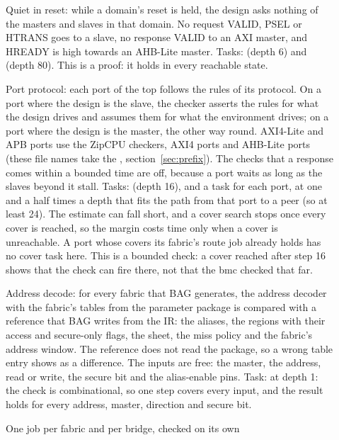 \begin{description}
\item[] Quiet in reset: while a domain's reset is held, the design
  asks nothing of the masters and slaves in that domain. No request VALID, PSEL or
  HTRANS goes to a slave, no response VALID to an AXI master, and HREADY is high towards
  an AHB-Lite master. Tasks:  (depth 6) and  (depth 80). This
  is a proof: it holds in every reachable state.
\item[] Port protocol: each port of the top follows the rules of
  its protocol. On a port where the design is the slave, the checker asserts the rules
  for what the design drives and assumes them for what the environment drives; on a
  port where the design is the master, the other way round. AXI4-Lite and APB ports use
  the ZipCPU checkers, AXI4 ports  and AHB-Lite ports
   (these file names take the ,
  section~\ref{sec:prefix}). The checks that a response comes within a bounded time are off,
  because a port waits as long as the slaves beyond it stall. Tasks:  (depth
  16), and a  task for each port, at one and a half times a depth that
  fits the path from that port to a peer (so at least 24). The estimate can fall short, and
  a cover search stops once every cover is reached, so the margin costs time only when a
  cover is unreachable. A port whose covers its fabric's route job already
  holds has no cover task here. This is a bounded check: a cover reached after step
  16 shows that the check can fire there, not that the bmc checked that far.
\item[] Address decode: for every fabric that BAG generates, the
  address decoder with the fabric's tables from the parameter package is compared with a
  reference that BAG writes from the IR: the aliases, the regions with their access and
  secure-only flags, the  sheet, the miss policy and the fabric's address
  window. The reference does not read the package, so a wrong table entry shows as a
  difference. The inputs are free: the master, the address, read or write, the secure bit
  and the alias-enable pins. Task:
   at depth 1: the check is combinational, so one step covers every input,
  and the result holds for every address, master, direction and secure bit.
\item[] One job per fabric and per bridge, checked on its own

\end{description}
